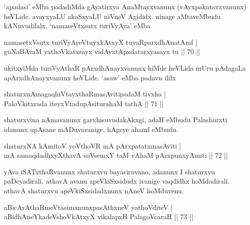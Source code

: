 \begin{artha} 
`apadasi' eMba padadiMda gAyatirxya AnaMtayxvanunx 
(vAyxpakatavxvanunx) heVLide. avayxyaLU akaSxyaLU niVneV Agididx. 
ninage aMtaveMbudu kANuvudilalx. `namaseVtx\s sutx turiVyAya' eMba 
\end{artha}

\begin{shl}
namasetxV\s sutx turiVyAyeVtuyxkAtxyX tuyaRparxdhAnatAmf | \\
guNaBAvaM yathoVkatxsayx vidAyxtApxdatarxyasayx tu \hfill||  70 || 
\end{shl}

\begin{artha} 
ukitxyiMda turiVyAthaR pArxdhAnayxvanunx hiMde heVLida mUru pAdagaLa 
apArxdhAnayxvanunx heVLide. `asaw' eMba padavu ililx
\end{artha}

\begin{shl}
shaturxnAmagaqhiVtayxthaRmasAvitipadaM tivxha | \\
PaloVkitxrada iteyxVtadupAsiturahaM tathA \hfill||  71 || 
\end{shl}

\begin{artha} 
shaturxvina nAmavanunx garxhisuvudakAkxgi, adaH eMbudu Palashurxti 
idanunx upAsane mADuvavanige. hAgeye ahamf eMbudu.
\end{artha}


\begin{shl}
shaturxNA kAmitoV yoV\s thoVR mA pArxpatatxmasAviti | \\
mA samaqdadhxyXthavA soV\s semxY taM vA\s haM pArxpunxyAmiti \hfill||  72 || 
\end{shl}

\begin{artha} 
yAva iSATxthaRvanunx shaturxvu bayasiruvano, adanunx I shaturxvu 
paDeyadirali. athavA avanu apeVkiSxsidudx ivanige vaqdidhx 
hoMdadirali. athavA shaturxvu apeVkiSxsidadxnunx nAneV hoMduvenu.
\end{artha}


\begin{shl}
aBicArAthaRmeVtasimxnunxpasAthxneV yathoVditeV | \\
\footnotemark[1]{}aBidhAneYkadeVshoVkAtxyX vikalapxH PalagoVcaraH \hfill||  73 || 
\end{shl}

